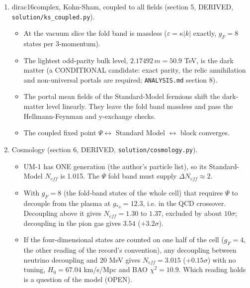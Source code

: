 \documentclass[11pt]{article}
\begin{document}
\begin{enumerate}
\begin{itemize}
\item The electron, up, down and neutrino masses come from chiral zero modes with $c_f = f\mu_fL \approx 10$ to $19.5$.
\item The uncertainty estimate $\hbar c/(2\Delta s)$ exceeds every fermion mass by a factor $5\times10^{7}$ to $10^{16}$. Chiral zero modes are the exception to the author's Heisenberg argument; the W mass, too, comes 99.9 \% from the tip. The argument holds for the $x_0$ excitations, the dark matter included (\texttt{ANALYSIS.\allowbreak{}md}).
\end{itemize}
\item dirac16complex, Kohn-Sham, coupled to all fields (section 5, DERIVED, \texttt{solution/\allowbreak{}ks\_\allowbreak{}coupled.\allowbreak{}py}).
\begin{itemize}
\item At the vacuum slice the fold band is massless ($\varepsilon = \kappa|k|$ exactly, $g_F = 8$ states per 3-momentum).
\item The lightest odd-parity bulk level, $2.17492\,m = 50.9$ TeV, is the dark matter (a CONDITIONAL candidate: exact parity, the relic annihilation and non-universal portals are required; \texttt{ANALYSIS.\allowbreak{}md} section 8).
\item The portal mean fields of the Standard-Model fermions shift the dark-matter level linearly. They leave the fold band massless and pass the Hellmann-Feynman and y-exchange checks.
\item The coupled fixed point $\Psi \leftrightarrow$ Standard Model $\leftrightarrow$ block converges.
\end{itemize}
\item Cosmology (section 6, DERIVED, \texttt{solution/\allowbreak{}cosmology.\allowbreak{}py}).
\begin{itemize}
\item UM-1 has ONE generation (the author's particle list), so its Standard-Model $N_{eff}$ is 1.015. The $\Psi$ fold band must supply $\Delta N_{eff} \approx 2$.
\item With $g_F = 8$ (the fold-band states of the whole cell) that requires $\Psi$ to decouple from the plasma at $g_{*s} = 12.3$, i.e. in the QCD crossover. Decoupling above it gives $N_{eff} = 1.30$ to $1.37$, excluded by about $10\sigma$; decoupling in the pion gas gives $3.54$ ($+3.2\sigma$).
\item If the four-dimensional states are counted on one half of the cell ($g_F = 4$, the other reading of the record's convention), any decoupling between neutrino decoupling and 20 MeV gives $N_{eff} = 3.015$ ($+0.15\sigma$) with no tuning, $H_0 = 67.04$ km/s/Mpc and BAO $\chi^2 = 10.9$. Which reading holds is a question of the model (OPEN).

\end{itemize}
\end{enumerate}
\end{document}
